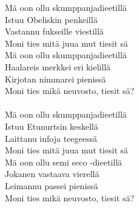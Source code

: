 
            Mä oon ollu skumppanjadieetillä  \\
            Istuu Obeliskin penkeillä  \\
            Vastannu fukseille viestillä  \\
            Moni ties mitä juua mut tiesit sä  \\
            Mä oon ollu skumppanjadieetillä \\
            Haalareis merkkei eri kielillä \\
            Kirjotan nimmarei pienissä \\
            Moni ties mikä neuvosto, tiesit sä? \\
\hspace{10mm} \\
            Mä oon ollu skumppanjadieetillä \\
            Istuu Etunurtsin keskellä \\
            Laittanu infoja teegeessä \\
            Moni ties mitä juua mut tiesit sä \\
            Mä oon ollu semi seco -dieetillä \\
            Jokanen vastaava vierellä \\
            Leimannu passei pienissä \\
            Moni ties mikä neuvosto, tiesit sä? \\
